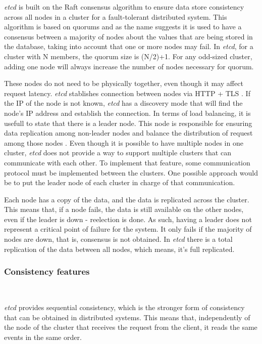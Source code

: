 \documentclass[screen,review]{acmart}
\begin{document}
\textit{etcd}  is built on the Raft consensus algorithm \cite{raft} to ensure data store consistency across all nodes in a cluster for a fault-tolerant distributed system. This algorithm is based on quorums and as the name suggests it is used to have a consensus between a majority of nodes about the values that are being stored in the database, taking into account that one or more nodes may fail. In \textit{etcd}, for a cluster with N members, the quorum size is (N/2)+1. For any odd-sized cluster, adding one node will always increase the number of nodes necessary for quorum.

These nodes do not need to be physically together, even though it may affect request latency. \textit{etcd} stablishes connection between nodes via HTTP + TLS \cite{http}. If the IP of the node is not known, \textit{etcd} has a discovery mode that will find the node's IP address and establish the connection.
In terms of load balancing, it is usefull to state that there is a leader node. This node is responsible for ensuring data replication among non-leader nodes and balance the distribution of request among those nodes \cite{etcd_faq}.
Even though it is possible to have multiple nodes in one cluster, \textit{etcd} does not provide a way to support multiple clusters that can communicate with each other. To implement that feature, some communication protocol must be implemented between the clusters. One possible approach would be to put the leader node of each cluster in charge of that communication.

Each node has a copy of the data, and the data is replicated across the cluster. This means that, if a node fails, the data is still available on the other nodes, even if the leader is down - reelection is done. As such, having a leader does not represent a critical point of failure for the system. It only fails if the majority of nodes are down, that is, consensus is not obtained.
In \textit{etcd} there is a total replication of the data between all nodes, which means, it's full replicated. \\

\subsubsection{Consistency features}~\

\textit{etcd} provides sequential consistency, which is the stronger form of consistency that can be obtained in distributed systems. This means that, independently of the node of the cluster that receives the request from the client, it reads the same events in the same order.
\end{document}
